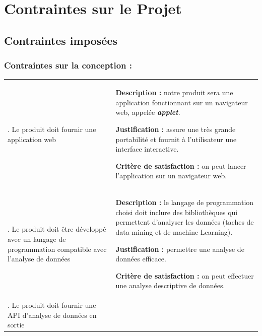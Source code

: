 	\section{Contraintes sur le Projet}
		\subsection{Contraintes imposées}
			\subsubsection{Contraintes sur la conception :}
				\begin{center}\begin{longtable}{|>{\centering}m{3cm}|>{\raggedright\arraybackslash}m{10cm}|}			
				\hline \multicolumn{1}{|c}{\textbf{Contrainte}} & \multicolumn{1}{|c|}{\textbf{Fiche}} \\
				\hline 	1. Le produit doit fournir une application web &
						\begin{description}[style=unboxed,leftmargin=0.2cm]
						\item{\textbf{Description :}} notre produit sera une application fonctionnant sur un navigateur web, appelée \textbf{\textit{applet}}.
						\item{\textbf{Justification :}} assure une très grande portabilité et fournit à l'utilisateur une interface interactive.
						\item{\textbf{Critère de satisfaction :}} on peut lancer l'application sur un navigateur web.
						\end{description}\\
				\hline 2. Le produit doit être développé avec un langage de programmation compatible avec l'analyse de données &
						\begin{description}[style=unboxed,leftmargin=0.2cm]
						\item{\textbf{Description :}} le langage de programmation choisi doit inclure des bibliothèques qui permettent d'analyser les données (taches de data mining et de machine Learning).
						\item{\textbf{Justification :}} permettre une analyse de données efficace.
						\item{\textbf{Critère de satisfaction :}} on peut effectuer une analyse descriptive de données.
						\end{description}\\
				\hline 3. Le produit doit fournir une API d'analyse de données en sortie &
						\begin{description}[style=unboxed,leftmargin=0.2cm]

\end{description}
\end{longtable}
\end{center}
